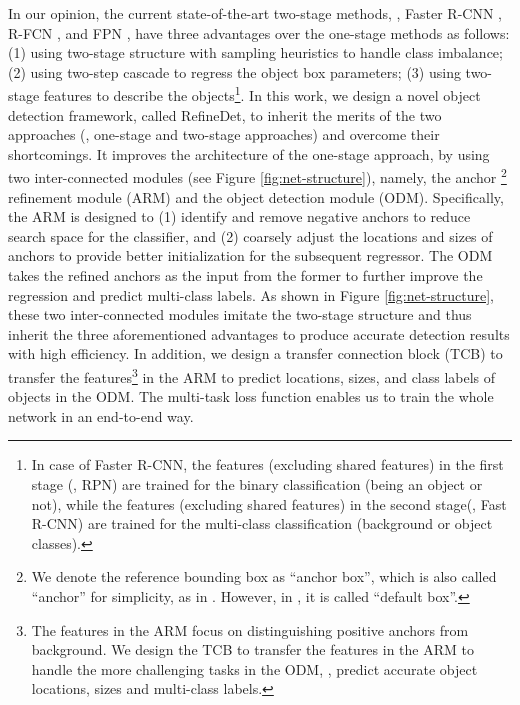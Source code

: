 \documentclass[10pt,twocolumn,letterpaper]{article}
\begin{document}
In our opinion, the current state-of-the-art two-stage methods, \eg, Faster R-CNN \cite{DBLP:journals/pami/RenHG017}, R-FCN \cite{DBLP:conf/nips/DaiLHS16}, and FPN \cite{DBLP:conf/cvpr/LinDGHHB17}, have three advantages over the one-stage methods as follows: (1) using two-stage structure with sampling heuristics to handle class imbalance; (2) using two-step cascade to regress the object box parameters; (3) using two-stage features to describe the objects\footnote{In case of Faster R-CNN, the features (excluding shared features) in the first stage (\ie, RPN) are trained for the binary classification (being an object or not), while the features (excluding shared features) in the second stage(\ie, Fast R-CNN) are trained for the multi-class classification (background or object classes).}. In this work, we design a novel object detection framework, called RefineDet, to inherit the merits of the two approaches (\ie, one-stage and two-stage approaches) and overcome their shortcomings. It improves the architecture of the one-stage approach, by using two inter-connected modules (see Figure \ref{fig:net-structure}), namely, the anchor \footnote{We denote the reference bounding box as ``anchor box'', which is also called ``anchor'' for simplicity, as in \cite{DBLP:journals/pami/RenHG017}. However, in \cite{DBLP:conf/eccv/LiuAESRFB16}, it is called ``default box''.} refinement module (ARM) and the object detection module (ODM). Specifically, the ARM is designed to (1) identify and remove negative anchors to reduce search space for the classifier, and (2) coarsely adjust the locations and sizes of anchors to provide better initialization for the subsequent regressor. The ODM takes the refined anchors as the input from the former to further improve the regression and predict multi-class labels. As shown in Figure \ref{fig:net-structure}, these two inter-connected modules imitate the two-stage structure and thus inherit the three aforementioned advantages to produce accurate detection results with high efficiency. In addition, we design a transfer connection block (TCB) to transfer the features\footnote{The features in the ARM focus on distinguishing positive anchors from background. We design the TCB to transfer the features in the ARM to handle the more challenging tasks in the ODM, \ie, predict accurate object locations, sizes and multi-class labels.} in the ARM to predict locations, sizes, and class labels of objects in the ODM. The multi-task loss function enables us to train the whole network in an end-to-end way.
\end{document}
